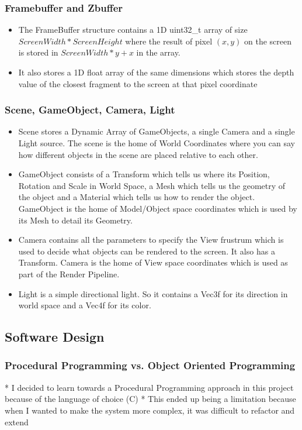 \documentclass{article}
\begin{document}
\subsubsection{Framebuffer and Zbuffer}
\begin{itemize}
	\item The FrameBuffer structure contains a 1D uint32\_t array of size $Screen Width * Screen Height$ where the result of pixel $(x,y)$ on the screen is stored in $ScreenWidth * y + x$ in the array. 
	\item It also stores a 1D float array of the same dimensions which stores the depth value of the closest fragment to the screen at that pixel coordinate
\end{itemize}
\subsubsection{Scene, GameObject, Camera, Light}
\begin{itemize}
	\item Scene stores a Dynamic Array of GameObjects, a single Camera and a single Light source. The scene is the home of World Coordinates where you can say how different objects in the scene are placed relative to each other. 
	\item GameObject consists of a Transform which tells us where its Position, Rotation and Scale in World Space, a Mesh which tells us the geometry of the object and a Material which tells us how to render the object. GameObject is the home of Model/Object space coordinates which is used by its Mesh to detail its Geometry.
	\item Camera contains all the parameters to specify the View frustrum which is used to decide what objects can be rendered to the screen. It also has a Transform. Camera is the home of View space coordinates which is used as part of the Render Pipeline.
	\item Light is a simple directional light. So it contains a Vec3f for its direction in world space and a Vec4f for its color.
\end{itemize}


\subsection{Software Design}
\subsubsection{Procedural Programming vs. Object Oriented Programming}
* I decided to learn towards a Procedural Programming approach in this project because of the language of choice (C)
* This ended up being a limitation because when I wanted to make the system more complex, it was difficult to refactor and extend
\end{document}
